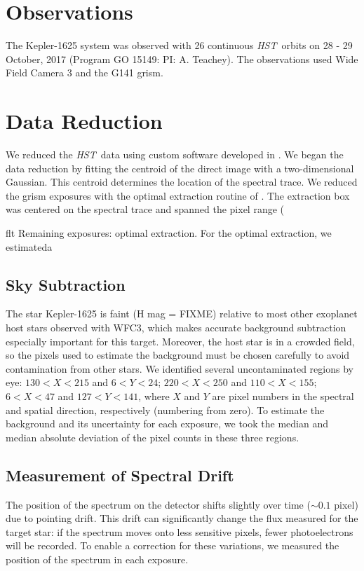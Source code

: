 \documentclass[twocolumn]{aastex62}
\newcommand{\project}[1]{\textsl{#1}}
\newcommand{\HST}{\project{HST}}
\begin{document}
\section{Observations} \label{sec:observations}
The Kepler-1625 system was observed with 26 continuous \HST\ orbits on 28 - 29 October, 2017 (Program GO 15149: PI: A. Teachey). The observations used Wide Field Camera 3 and the G141 grism.


\section{Data Reduction} \label{sec:reduction}
We reduced the \HST\ data using custom software developed in \cite{kreidberg14a}. We began the data reduction by fitting the centroid of the direct image with a two-dimensional Gaussian. This centroid determines the location of the spectral trace. We reduced the grism exposures with the optimal extraction routine of \citep{horne86}. The extraction box was centered on the spectral trace and spanned the pixel range ( 

flt
Remaining exposures: optimal extraction. For the optimal extraction, we estimateda 

\subsection{Sky Subtraction}
The star Kepler-1625 is faint (H mag = FIXME) relative to most other exoplanet host stars observed with WFC3, which makes accurate background subtraction especially important for this target. Moreover, the host star is in a crowded field, so the pixels used to estimate the background must be chosen carefully to avoid contamination from other stars.  We identified several uncontaminated regions by eye: $130 < X < 215$ and $6 < Y  < 24$;  $220 < X < 250$ and $110 < X < 155$; $6 < X < 47$ and $127 < Y < 141$, where $X$ and $Y$ are pixel numbers in the spectral and spatial direction, respectively (numbering from zero).  To estimate the background and its uncertainty for each exposure, we took the median and median absolute deviation of the pixel counts in these three regions. 

\subsection{Measurement of Spectral Drift}
The position of the spectrum on the detector shifts slightly over time ($\sim0.1$ pixel) due to pointing drift. This drift can significantly change the flux measured for the target star: if the spectrum moves onto less sensitive pixels, fewer photoelectrons will be recorded. To enable a correction for these variations, we measured the position of the spectrum in each exposure. 
\end{document}
